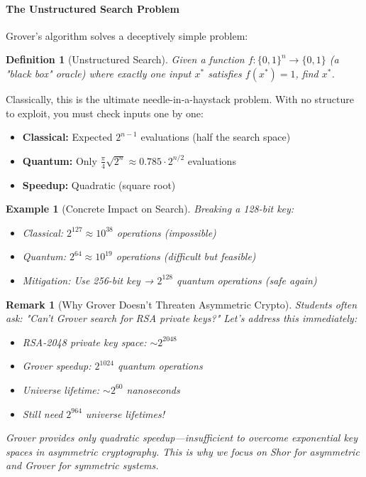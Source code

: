 \documentclass[11pt,a4paper]{article}
\newtheorem{definition}{Definition}
\newtheorem{example}{Example}
\newtheorem{remark}{Remark}
\begin{document}
\paragraph{The Unstructured Search Problem}

Grover's algorithm solves a deceptively simple problem:

\begin{definition}[Unstructured Search]
Given a function $f: \{0,1\}^n \to \{0,1\}$ (a "black box" oracle) where exactly one input $x^*$ satisfies $f(x^*) = 1$, find $x^*$.
\end{definition}

Classically, this is the ultimate needle-in-a-haystack problem. With no structure to exploit, you must check inputs one by one:

\begin{itemize}
    \item \textbf{Classical:} Expected $2^{n-1}$ evaluations (half the search space)
    \item \textbf{Quantum:} Only $\frac{\pi}{4}\sqrt{2^n} \approx 0.785 \cdot 2^{n/2}$ evaluations
    \item \textbf{Speedup:} Quadratic (square root)
\end{itemize}

\begin{example}[Concrete Impact on Search]
Breaking a 128-bit key:
\begin{itemize}
    \item Classical: $2^{127} \approx 10^{38}$ operations (impossible)
    \item Quantum: $2^{64} \approx 10^{19}$ operations (difficult but feasible)
    \item Mitigation: Use 256-bit key → $2^{128}$ quantum operations (safe again)
\end{itemize}
\end{example}

\begin{remark}[Why Grover Doesn't Threaten Asymmetric Crypto]
Students often ask: "Can't Grover search for RSA private keys?" Let's address this immediately:
\begin{itemize}
    \item RSA-2048 private key space: $\sim 2^{2048}$
    \item Grover speedup: $2^{1024}$ quantum operations
    \item Universe lifetime: $\sim 2^{60}$ nanoseconds
    \item Still need $2^{964}$ universe lifetimes!
\end{itemize}
Grover provides only quadratic speedup---insufficient to overcome exponential key spaces in asymmetric cryptography. This is why we focus on Shor for asymmetric and Grover for symmetric systems.
\end{remark}
\end{document}

